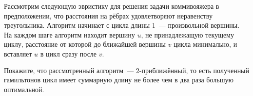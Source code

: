 Рассмотрим следующую эвристику для решения задачи коммивояжера в предположении, что расстояния на рёбрах
удовлетворяют неравенству треугольника. Алгоритм начинает с цикла длины $1$~--- произвольной вершины. На
каждом шаге алгоритм находит вершину $u$, не принадлежащую текущему циклу, расстояние от которой до
ближайшей вершины $v$ цикла минимально, и вставляет $u$ в цикл сразу после $v$.

Покажите, что рассмотренный алгоритм~--- $2$-приближённый, то есть полученный гамильтонов цикл имеет
суммарную длину не более чем в два раза большую оптимальной.


